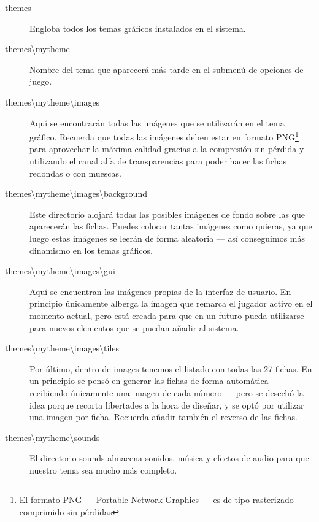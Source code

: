 \begin{description}
    \item[themes] Engloba todos los temas gráficos instalados en el sistema.
        \item[themes\textbackslash{}mytheme] Nombre del tema que aparecerá más tarde en el submenú de opciones de juego.
             \item[themes\textbackslash{}mytheme\textbackslash{}images] Aquí se encontrarán todas las imágenes que se utilizarán en el tema gráfico. Recuerda que
                todas las imágenes deben estar en formato PNG\footnote{El formato PNG --- Portable Network Graphics --- es de 
                tipo rasterizado comprimido sin pérdidas} para aprovechar la máxima calidad gracias a la compresión
                sin pérdida y utilizando el canal alfa de transparencias para poder hacer las fichas redondas o con
                muescas.
                \item[themes\textbackslash{}mytheme\textbackslash{}images\textbackslash{}background] Este directorio alojará todas las posibles imágenes de fondo sobre las que aparecerán
                    las fichas. Puedes colocar tantas imágenes como quieras, ya que luego estas imágenes se leerán
                    de forma aleatoria --- así conseguimos más dinamismo en los temas gráficos.
                \item[themes\textbackslash{}mytheme\textbackslash{}images\textbackslash{}gui] Aquí se encuentran las imágenes propias de la interfaz de usuario. En principio únicamente
                    alberga la imagen que remarca el jugador activo en el momento actual, pero está creada para que
                    en un futuro pueda utilizarse para nuevos elementos que se puedan añadir al sistema.
                \item[themes\textbackslash{}mytheme\textbackslash{}images\textbackslash{}tiles] Por último, dentro de images tenemos el listado con todas las 27 fichas. En un principio
                    se pensó en generar las fichas de forma automática --- recibiendo únicamente una imagen de cada
                    número --- pero se desechó la idea porque recorta libertades a la hora de diseñar, y se optó
                    por utilizar una imagen por ficha. Recuerda añadir también el reverso de las fichas.
            \item[themes\textbackslash{}mytheme\textbackslash{}sounds] El directorio sounds almacena sonidos, música y efectos de audio para que nuestro tema sea mucho
                    más completo.

\end{description}
